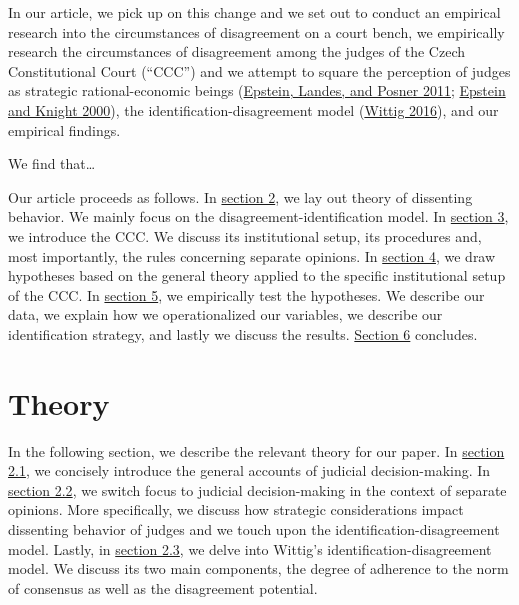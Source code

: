 \documentclass[
  11pt,
]{article}
\begin{document}
In our article, we pick up on this change and we set out to conduct an
empirical research into the circumstances of disagreement on a court
bench, we empirically research the circumstances of disagreement among
the judges of the Czech Constitutional Court (``CCC'') and we attempt to
square the perception of judges as strategic rational-economic beings
(\protect\hyperlink{ref-epsteinWhyWhenJudges2011}{Epstein, Landes, and
Posner 2011};
\protect\hyperlink{ref-epsteinStrategicRevolutionJudicial2000}{Epstein
and Knight 2000}), the identification-disagreement model
(\protect\hyperlink{ref-wittigOccurrenceSeparateOpinions2016}{Wittig
2016}), and our empirical findings.

We find that\ldots{}

Our article proceeds as follows. In \protect\hyperlink{theory}{section
2}, we lay out theory of dissenting behavior. We mainly focus on the
disagreement-identification model. In \protect\hyperlink{primer}{section
3}, we introduce the CCC. We discuss its institutional setup, its
procedures and, most importantly, the rules concerning separate
opinions. In \protect\hyperlink{hypotheses}{section 4}, we draw
hypotheses based on the general theory applied to the specific
institutional setup of the CCC. In \protect\hyperlink{empirics}{section
5}, we empirically test the hypotheses. We describe our data, we explain
how we operationalized our variables, we describe our identification
strategy, and lastly we discuss the results.
\protect\hyperlink{conclusion}{Section 6} concludes.

\hypertarget{theory}{%
\section{Theory}\label{theory}}

In the following section, we describe the relevant theory for our paper.
In \protect\hyperlink{accounts}{section 2.1}, we concisely introduce the
general accounts of judicial decision-making. In
\protect\hyperlink{dissenting-behavior}{section 2.2}, we switch focus to
judicial decision-making in the context of separate opinions. More
specifically, we discuss how strategic considerations impact dissenting
behavior of judges and we touch upon the identification-disagreement
model. Lastly, in
\protect\hyperlink{identification-disagreement}{section 2.3}, we delve
into Wittig's identification-disagreement model. We discuss its two main
components, the degree of adherence to the norm of consensus as well as
the disagreement potential.
\end{document}
